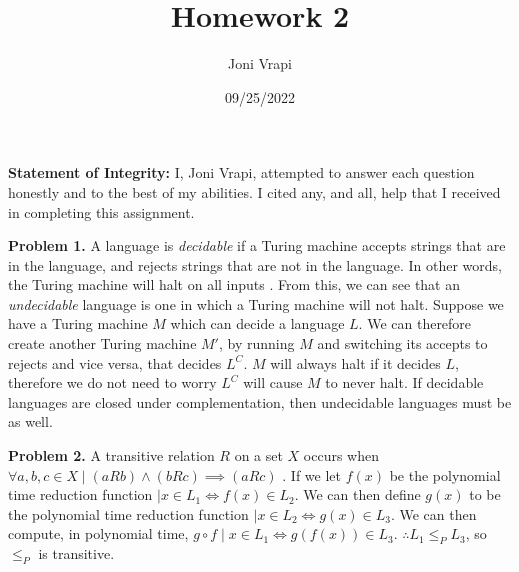 \documentclass{article}
\title{Homework 2}
\author{Joni Vrapi}
\date{09/25/2022}
\begin{document}
\maketitle

\textbf{Statement of Integrity:} I, Joni Vrapi, attempted to answer each question honestly and to the best of my abilities. I cited any, and all, help that I received in completing this assignment.

\hfill

\textbf{Problem 1.} A language is \emph{decidable} if a Turing machine accepts strings that are in the language, and rejects strings that are not in the language. In other words, the Turing machine will halt on all inputs \cite{website:1}. From this, we can see that an \emph{undecidable} language is one in which a Turing machine will not halt. Suppose we have a Turing machine $M$ which can decide a language $L$. We can therefore create another Turing machine $M'$, by running $M$ and switching its accepts to rejects and vice versa, that decides $L^C$. $M$ will always halt if it decides $L$, therefore we do not need to worry $L^C$ will cause $M$ to never halt. If decidable languages are closed under complementation, then undecidable languages must be as well.

\hfill

\textbf{Problem 2.} A transitive relation $R$ on a set $X$ occurs when $\forall a, b, c \in X \mid (aRb) \land (bRc) \implies (aRc)$ \cite{website:2}. If we let $f(x)$ be the polynomial time reduction function $\mid x \in L_1 \iff f(x) \in L_2$. We can then define $g(x)$ to be the polynomial time reduction function $\mid x \in L_2 \iff g(x) \in L_3$. We can then compute, in polynomial time, $g \circ f \mid x \in L_1 \iff g(f(x)) \in L_3$. $\therefore L_1 \leq_P L_3$, so $\leq_P$ is transitive.

\newpage
 

\end{document}
